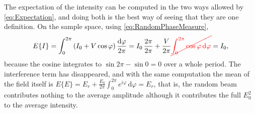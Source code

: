 		The expectation of the intensity can be computed in the two ways allowed by
		\eqref{eq:Expectation}, and doing both is the best way of seeing that they are one
		definition. On the sample space, using \eqref{eq:RandomPhaseMeasure},
		\begin{equation}\label{eq:RandomPhaseMean}
			E\{I\} = \int_{0}^{2\pi}\left(I_{0} + V\cos\varphi\right)\frac{\mathrm{d}\varphi}{2\pi}
			= I_{0}\,\frac{2\pi}{2\pi} + \frac{V}{2\pi}\textcolor{red}{\cancel{\int_{0}^{2\pi}\cos\varphi\,\mathrm{d}\varphi}}
			= I_{0},
		\end{equation}
		because the cosine integrates to $\sin 2\pi - \sin 0 = 0$ over a whole period. The
		interference term has disappeared, and with the same computation the mean of the field
		itself is $E\{E\} = E_{r} + \frac{E_{0}}{2\pi}\int_{0}^{2\pi}e^{i\varphi}\,\mathrm{d}\varphi = E_{r}$,
		that is, the random beam contributes nothing to the average amplitude although it
		contributes the full $E_{0}^{2}$ to the average intensity.

